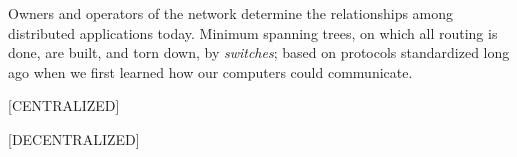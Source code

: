 \documentclass[../../../OAE-SPEC-MAIN.tex]{subfiles}
\begin{document}
%


\begin{highlightbox} 
\noindent Owners and operators of the network determine the relationships among distributed applications today. %
Minimum spanning trees, on which all routing is done, are built, and torn down, by \emph{switches}; based on protocols standardized long ago when we first learned how our computers could communicate. %
\end{highlightbox}


[CENTRALIZED]
%

[DECENTRALIZED]




\end{document}

